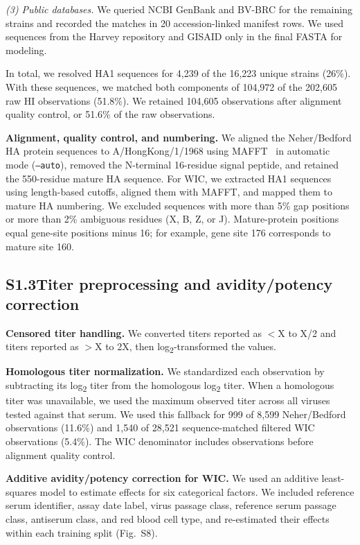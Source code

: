 \documentclass[12pt]{article}
\begin{document}
\textit{(3) Public databases.} We queried NCBI GenBank and BV-BRC for the remaining strains and recorded the matches in 20 accession-linked manifest rows. We used sequences from the Harvey repository and GISAID only in the final FASTA for modeling.

In total, we resolved HA1 sequences for 4,239 of the 16,223 unique strains (26\%). With these sequences, we matched both components of 104,972 of the 202,605 raw HI observations (51.8\%). We retained 104,605 observations after alignment quality control, or 51.6\% of the raw observations.

\textbf{Alignment, quality control, and numbering.} We aligned the Neher/Bedford HA protein sequences to A/HongKong/1/1968 using MAFFT~\cite{Katoh2013MolBiolEvol} in automatic mode (\texttt{--auto}), removed the N-terminal 16-residue signal peptide, and retained the 550-residue mature HA sequence. For WIC, we extracted HA1 sequences using length-based cutoffs, aligned them with MAFFT, and mapped them to mature HA numbering. We excluded sequences with more than 5\% gap positions or more than 2\% ambiguous residues (X, B, Z, or J). Mature-protein positions equal gene-site positions minus 16; for example, gene site 176 corresponds to mature site 160.

\subsection*{S1.3\quad Titer preprocessing and avidity/potency correction}

\textbf{Censored titer handling.} We converted titers reported as $<$X to X/2 and titers reported as $>$X to 2X, then log\textsubscript{2}-transformed the values.

\textbf{Homologous titer normalization.} We standardized each observation by subtracting its log\textsubscript{2} titer from the homologous log\textsubscript{2} titer. When a homologous titer was unavailable, we used the maximum observed titer across all viruses tested against that serum. We used this fallback for 999 of 8,599 Neher/Bedford observations (11.6\%) and 1,540 of 28,521 sequence-matched filtered WIC observations (5.4\%). The WIC denominator includes observations before alignment quality control.

\textbf{Additive avidity/potency correction for WIC.} We used an additive least-squares model to estimate effects for six categorical factors. We included reference serum identifier, assay date label, virus passage class, reference serum passage class, antiserum class, and red blood cell type, and re-estimated their effects within each training split (Fig.~S8).
\end{document}

